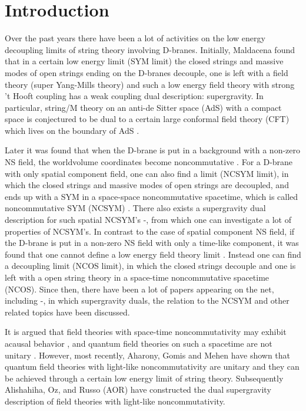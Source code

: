 \documentclass[a4paper,12pt]{article}
\providecommand{\sect}[1]{\setcounter{equation}{0}\section{#1}}
\begin{document}
\sect{Introduction}
Over the past years there have been a lot of activities on the low energy
decoupling limits of string theory involving D\coordHE{}-branes. Initially,
Maldacena \cite{Mald1}
found that in a certain low energy limit (SYM limit) the closed strings and
massive modes of open strings ending on the D\coordHE{}-branes decouple, one is
left with a field theory (super Yang-Mills theory) and such a low energy
field theory with strong 't Hooft coupling has a weak coupling dual
description: supergravity. In particular, string/M theory on
an anti-de Sitter space (AdS) with a compact space is conjectured to be
dual to a certain large \coordHE{} conformal field theory (CFT) which lives on the
boundary of AdS \cite{Mald1,Gubs,Witt1,Itzh}.

Later it was found that when the D\coordHE{}-brane is put in a background with a
non-zero NS \coordHE{} field, the worldvolume coordinates become noncommutative
\cite{Dougl,Chu,Arda}. For a D\coordHE{}-brane with only spatial component \coordHE{} field,
one can also find a limit (NCSYM limit), in which the closed strings and
massive modes of open strings are decoupled, and ends up with a SYM in a
space-space noncommutative spacetime, which is called noncommutative SYM
(NCSYM) \cite{Seib1}. There also exists a supergravity dual description for
such spatial NCSYM's \cite{Mald2}-\cite{Youm},
from which one can investigate a lot of properties of NCSYM's. In contrast
to the case of spatial component NS \coordHE{} field, if the D\coordHE{}-brane is put in
a non-zero NS \coordHE{} field with only a time-like component, it was found that
one cannot define a low energy field theory limit \cite{Seib2,Gopa1,Barb2}.
Instead one can find a decoupling limit (NCOS limit), in which the closed
strings decouple and one is left with a open string theory in a space-time
noncommutative spacetime (NCOS). Since then, there have been a lot of papers
appearing on the net, including \cite{Seib3}-\cite{LRS2}, in which
supergravity duals, the relation to the NCSYM and other related topics
have been discussed.

It is argued that field theories with space-time noncommutativity may
exhibit acausal behavior \cite{Seib3,Alva}, and quantum field theories on
such a spacetime are not unitary \cite{Gomi}. However, most recently,
Aharony, Gomis and Mehen \cite{AGM} have shown that quantum field theories
with light-like noncommutativity are unitary and they can be achieved through
a certain low energy limit of string theory. Subsequently Alishahiha, Oz, and
Russo (AOR)\cite{AOR} have constructed the dual supergravity description of
field theories with light-like noncommutativity.
\end{document}
